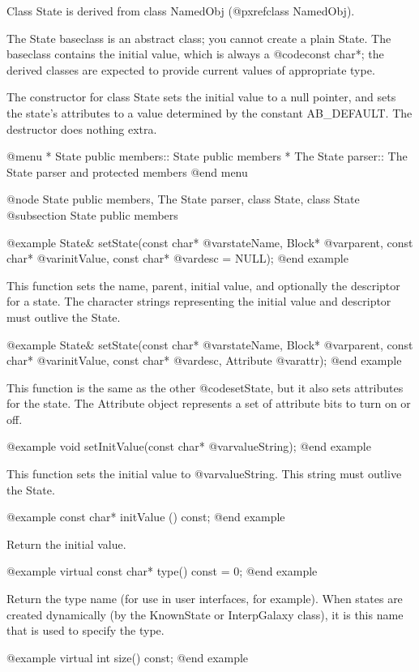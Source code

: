 Class State is derived from class NamedObj (@pxref{class NamedObj}).

The State baseclass is an abstract class; you cannot create a plain
State.  The baseclass contains the initial value, which is always
a @code{const char*}; the derived classes are expected to provide
current values of appropriate type.

The constructor for class State sets the initial value to a null
pointer, and sets the state's attributes to a value determined by
the constant AB_DEFAULT.  The destructor does nothing extra.

@menu
* State public members::        State public members
* The State parser::            The State parser and protected members
@end menu

@node State public members, The State parser, class State, class State
@subsection State public members

@example
State& setState(const char* @var{stateName}, Block* @var{parent},
               const char* @var{initValue}, const char* @var{desc} = NULL);
@end example

This function sets the name, parent, initial value, and optionally the
descriptor for a state.  The character strings representing the initial
value and descriptor must outlive the State.

@example
State& setState(const char* @var{stateName}, Block* @var{parent},
               const char* @var{initValue}, const char* @var{desc},
               Attribute @var{attr});
@end example

This function is the same as the other @code{setState}, but it also
sets attributes for the state.  The Attribute object represents a
set of attribute bits to turn on or off.

@example
void setInitValue(const char* @var{valueString});
@end example

This function sets the initial value to @var{valueString}.  This
string must outlive the State.

@example
const char* initValue () const;
@end example

Return the initial value.

@example
virtual const char* type() const = 0;
@end example

Return the type name (for use in user interfaces, for example).
When states are created dynamically (by the KnownState or InterpGalaxy
class), it is this name that is used to specify the type.

@example
virtual int size() const;
@end example


